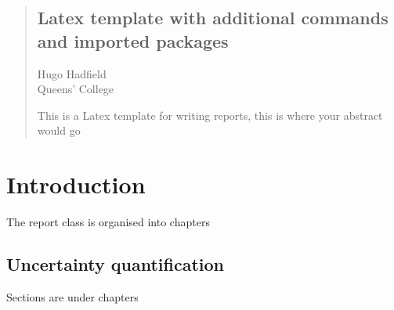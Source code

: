 \documentclass[12pt,a4paper,twoside=semi]{report}
\begin{document}
\tableofcontents

\begin{abstract}
\begin{center}
\section*{Latex template with additional commands and imported packages}
Hugo Hadfield\\
Queens' College
\end{center}

This is a Latex template for writing reports, this is where your abstract would go
\end{abstract}

\chapter{Introduction}
The report class is organised into chapters

\section{Uncertainty quantification}
Sections are under chapters
\end{document}
